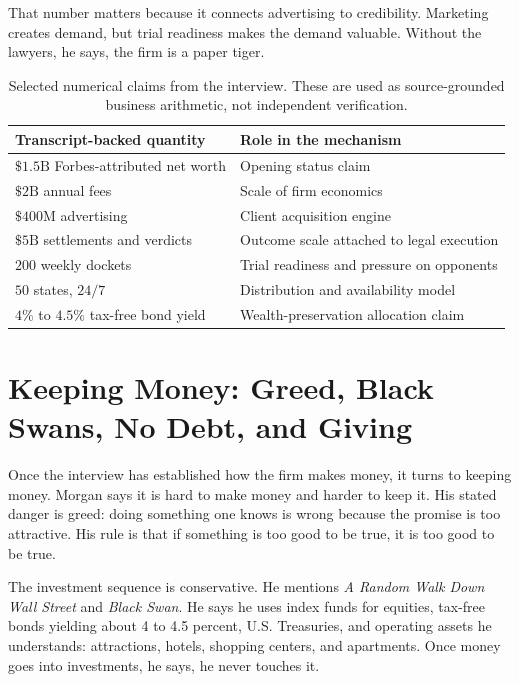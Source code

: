 That number matters because it connects advertising to credibility. Marketing creates demand, but trial readiness makes the demand valuable. Without the lawyers, he says, the firm is a paper tiger.

\begin{table}
\centering
\begin{tabular}{|p{.44\linewidth}|p{.44\linewidth}|}
\hline
Transcript-backed quantity & Role in the mechanism\\
\hline
\(\$1.5\mathrm{B}\) Forbes-attributed net worth & Opening status claim\\
\hline
\(\$2\mathrm{B}\) annual fees & Scale of firm economics\\
\hline
\(\$400\mathrm{M}\) advertising & Client acquisition engine\\
\hline
\(\$5\mathrm{B}\) settlements and verdicts & Outcome scale attached to legal execution\\
\hline
\(200\) weekly dockets & Trial readiness and pressure on opponents\\
\hline
\(50\) states, \(24/7\) & Distribution and availability model\\
\hline
\(4\%\) to \(4.5\%\) tax-free bond yield & Wealth-preservation allocation claim\\
\hline
\end{tabular}
\caption{Selected numerical claims from the interview. These are used as source-grounded business arithmetic, not independent verification.}
\end{table}

\section{Keeping Money: Greed, Black Swans, No Debt, and Giving}

Once the interview has established how the firm makes money, it turns to keeping money. Morgan says it is hard to make money and harder to keep it. His stated danger is greed: doing something one knows is wrong because the promise is too attractive. His rule is that if something is too good to be true, it is too good to be true.

The investment sequence is conservative. He mentions \emph{A Random Walk Down Wall Street} and \emph{Black Swan}. He says he uses index funds for equities, tax-free bonds yielding about 4 to 4.5 percent, U.S. Treasuries, and operating assets he understands: attractions, hotels, shopping centers, and apartments. Once money goes into investments, he says, he never touches it.

